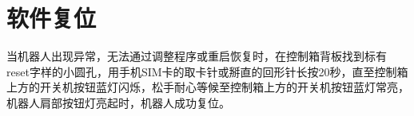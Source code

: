 \chapter{软件复位}

当机器人出现异常，无法通过调整程序或重启恢复时，在控制箱背板找到标有{\sf reset}字样的小圆孔，用手机SIM卡的取卡针或掰直的回形针长按20秒，直至控制箱上方的开关机按钮蓝灯闪烁，松手耐心等候至控制箱上方的开关机按钮蓝灯常亮，机器人肩部按钮灯亮起时，机器人成功复位。

